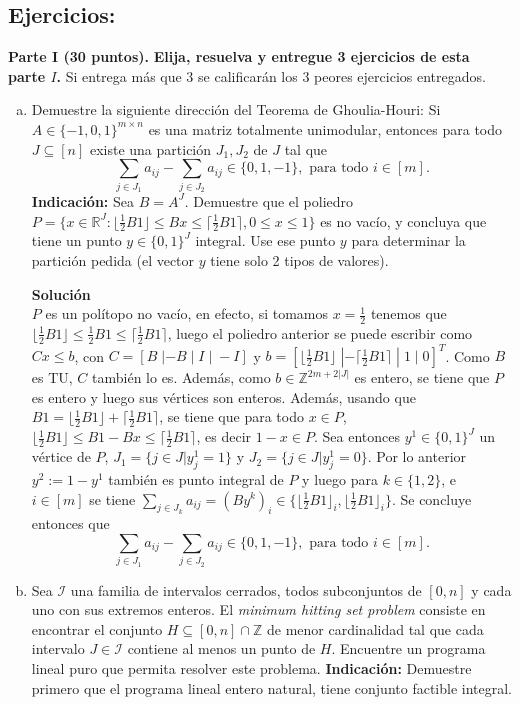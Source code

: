 \documentclass{article}
\newcommand{\RR}{\mathbb R}
\newcommand{\ZZ}{\mathbb Z}
\theoremstyle{plain}
\theoremstyle{definition}
\theoremstyle{Azul}
\begin{document}
\subsection*{Ejercicios:}
\noindent \textbf{Parte I (30 puntos).} \textbf{Elija, resuelva y entregue 3 ejercicios de esta parte $I$.} Si entrega más que 3 se calificarán los 3 peores ejercicios entregados.
\begin{enumerate}[(a)]
\item Demuestre la siguiente dirección del Teorema de Ghoulia-Houri: 
Si $A\in \{-1,0,1\}^{m\times n}$ es una matriz totalmente unimodular, entonces para todo $J\subseteq [n]$ existe una partición $J_1, J_2$ de $J$ tal que
$$\sum_{j\in J_1}a_{ij}-\sum_{j\in J_2}a_{ij} \in \{0,1,-1\}, \text{ para todo } i \in [m].$$
\textbf{Indicación:} Sea $B=A^J$. Demuestre que el poliedro $P=\{x\in \RR^J\colon \lfloor \frac12 B 1 \rfloor \leq Bx\leq \lceil \frac12 B 1\rceil, 0\leq x \leq 1\}$ es no vacío, y concluya que tiene un punto  $y\in \{0,1\}^J$ integral. Use ese punto $y$ para determinar la partición pedida (el vector $y$ tiene solo 2 tipos de valores).

\textbf{Solución}\\

$P$ es un polítopo no vacío, en efecto, si tomamos $x=\frac{1}{2}$ tenemos que $\lfloor \frac12 B 1 \rfloor \leq \frac{1}{2}B 1\leq \lceil \frac12 B 1\rceil$, luego el poliedro anterior se puede escribir como $Cx\leq b$, con $C =  [B\;|-B\;|\;I\;|\;-I]$ y $b=[\lfloor \frac12 B 1 \rfloor\;|-\!\lceil \frac12 B 1\rceil\;|\;1\;|\;0]^T$. Como $B$ es TU, $C$ también lo es. Además, como $b\in \mathbb{Z}^{2m+2|J|}$ es entero, se tiene que $P$ es entero y luego sus vértices son enteros. Además, usando que $B1 = \lfloor \frac 12 B1\rfloor + \lceil\frac 12 B1\rceil$, se tiene que para todo $x\in P$, $\lfloor \frac 12 B1\rfloor \leq B1 - Bx \leq \lceil \frac12 B1\rceil$, es decir $1-x\in P$. 
Sea entonces $y^1\in\{0,1\}^{J}$ un vértice de $P$, $J_{1}=\{j \in J| y^1_{j}=1\}$ y $J_{2}=\{j \in J| y^1_{j}=0\}$. Por lo anterior $y^2:=1-y^1$ también es punto integral de $P$ y luego para $k\in \{1,2\}$, e $i\in [m]$ se tiene 
$\sum_{j\in J_k}a_{ij}=(By^k)_i\in \{\lfloor\frac{1}{2}B1\rfloor_i, \lfloor\frac{1}{2}B1\rfloor_i\}$. Se concluye entonces que $$\sum_{j\in J_1}a_{ij}-\sum_{j\in J_2}a_{ij} \in \{0,1,-1\}, \text{ para todo } i \in [m].$$


\item Sea $\mathcal{I}$ una familia de intervalos cerrados, todos subconjuntos de $[0,n]$ y cada uno con sus extremos enteros. El \emph{minimum hitting set problem} consiste en encontrar el conjunto $H\subseteq [0,n]\cap \ZZ$ de menor cardinalidad tal que cada intervalo $J\in \mathcal{I}$ contiene al menos un punto de $H$. Encuentre un programa lineal puro que permita resolver este problema. \textbf{Indicación:} Demuestre primero que el programa lineal entero natural, tiene conjunto factible integral.


\end{enumerate}
\end{document}
